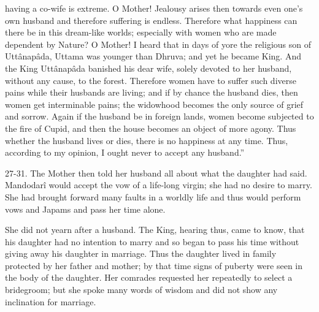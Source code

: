 having a co-wife is extreme. O Mother! Jealousy arises then towards even one's own husband and therefore suffering is endless. Therefore what happiness can there be in this dream-like worlds; especially with women who are made dependent by Nature? O Mother! I heard that in days of yore the religious son of Utt\^anap\^ada, Uttama was younger than Dhruva; and yet he became King. And the King Utt\^anap\^ada banished his dear wife, solely devoted to her husband, without any cause, to the forest. Therefore women have to suffer such diverse pains while their husbands are living; and if by chance the husband dies, then women get interminable pains; the widowhood becomes the only source of grief and sorrow. Again if the husband be in foreign lands, women become subjected to the fire of Cupid, and then the house becomes an object of more agony. Thus whether the husband lives or dies, there is no happiness at any time. Thus, according to my opinion, I ought never to accept any husband.''

27-31. The Mother then told her husband all about what the daughter had said. Mandodar\^i would accept the vow of a life-long virgin; she had no desire to marry. She had brought forward many faults in a worldly life and thus would perform vows and Japams and pass her time alone.

She did not yearn after a husband. The King, hearing thus, came to know, that his daughter had no intention to marry and so began to pass his time without giving away his daughter in marriage. Thus the daughter lived in family protected by her father and mother; by that time signs of puberty were seen in the body of the daughter. Her comrades requested her repeatedly to select a bridegroom; but she spoke many words of wisdom and did not show any inclination for marriage.

